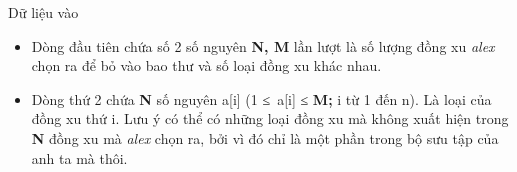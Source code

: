 Dữ liệu vào
\begin{itemize}
	\item     Dòng đầu tiên chứa số 2 số nguyên    \textbf{     N, M    }    lần lượt là số lượng đồng xu    \emph{     alex    }    chọn ra để bỏ vào bao thư và số loại đồng xu khác nhau.   
	\item     Dòng thứ 2 chứa    \textbf{     N    }    số nguyên a[i] (1 ≤ a[i] ≤    \textbf{     M;    }    i từ 1 đến n). Là loại của đồng xu thứ i. Lưu ý có thể có những loại đồng xu mà không xuất hiện trong    \textbf{     N    }    đồng xu mà    \emph{     alex    }    chọn ra, bởi vì đó chỉ là một phần trong bộ sưu tập của anh ta mà thôi.   
\end{itemize}
